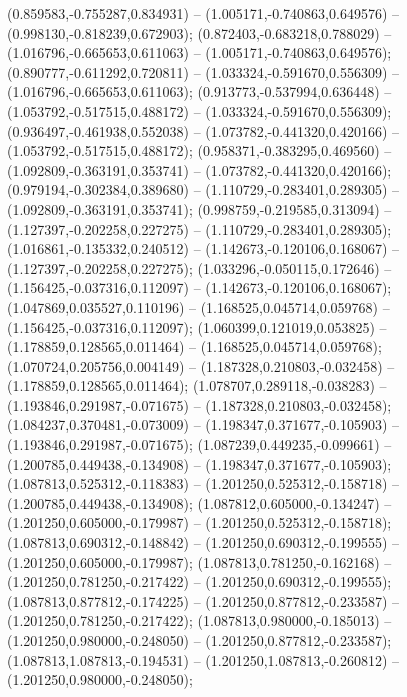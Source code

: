  (0.859583,-0.755287,0.834931) -- (1.005171,-0.740863,0.649576) -- (0.998130,-0.818239,0.672903);
 (0.872403,-0.683218,0.788029) -- (1.016796,-0.665653,0.611063) -- (1.005171,-0.740863,0.649576);
 (0.890777,-0.611292,0.720811) -- (1.033324,-0.591670,0.556309) -- (1.016796,-0.665653,0.611063);
 (0.913773,-0.537994,0.636448) -- (1.053792,-0.517515,0.488172) -- (1.033324,-0.591670,0.556309);
 (0.936497,-0.461938,0.552038) -- (1.073782,-0.441320,0.420166) -- (1.053792,-0.517515,0.488172);
 (0.958371,-0.383295,0.469560) -- (1.092809,-0.363191,0.353741) -- (1.073782,-0.441320,0.420166);
 (0.979194,-0.302384,0.389680) -- (1.110729,-0.283401,0.289305) -- (1.092809,-0.363191,0.353741);
 (0.998759,-0.219585,0.313094) -- (1.127397,-0.202258,0.227275) -- (1.110729,-0.283401,0.289305);
 (1.016861,-0.135332,0.240512) -- (1.142673,-0.120106,0.168067) -- (1.127397,-0.202258,0.227275);
 (1.033296,-0.050115,0.172646) -- (1.156425,-0.037316,0.112097) -- (1.142673,-0.120106,0.168067);
 (1.047869,0.035527,0.110196) -- (1.168525,0.045714,0.059768) -- (1.156425,-0.037316,0.112097);
 (1.060399,0.121019,0.053825) -- (1.178859,0.128565,0.011464) -- (1.168525,0.045714,0.059768);
 (1.070724,0.205756,0.004149) -- (1.187328,0.210803,-0.032458) -- (1.178859,0.128565,0.011464);
 (1.078707,0.289118,-0.038283) -- (1.193846,0.291987,-0.071675) -- (1.187328,0.210803,-0.032458);
 (1.084237,0.370481,-0.073009) -- (1.198347,0.371677,-0.105903) -- (1.193846,0.291987,-0.071675);
 (1.087239,0.449235,-0.099661) -- (1.200785,0.449438,-0.134908) -- (1.198347,0.371677,-0.105903);
 (1.087813,0.525312,-0.118383) -- (1.201250,0.525312,-0.158718) -- (1.200785,0.449438,-0.134908);
 (1.087812,0.605000,-0.134247) -- (1.201250,0.605000,-0.179987) -- (1.201250,0.525312,-0.158718);
 (1.087813,0.690312,-0.148842) -- (1.201250,0.690312,-0.199555) -- (1.201250,0.605000,-0.179987);
 (1.087813,0.781250,-0.162168) -- (1.201250,0.781250,-0.217422) -- (1.201250,0.690312,-0.199555);
 (1.087813,0.877812,-0.174225) -- (1.201250,0.877812,-0.233587) -- (1.201250,0.781250,-0.217422);
 (1.087813,0.980000,-0.185013) -- (1.201250,0.980000,-0.248050) -- (1.201250,0.877812,-0.233587);
 (1.087813,1.087813,-0.194531) -- (1.201250,1.087813,-0.260812) -- (1.201250,0.980000,-0.248050);
